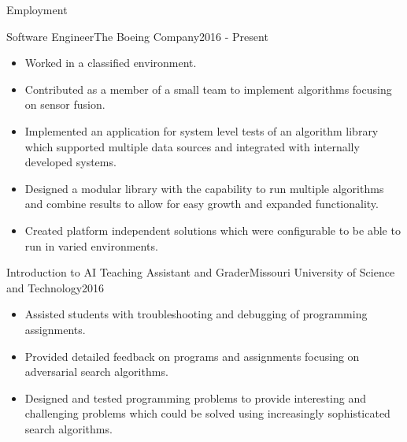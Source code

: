 \documentclass[]{mcdowellcv}
\begin{document}
    \makeheader
    
    \begin{cvsection}{Employment}

\begin{boeing}
        \begin{cvsubsection}{Software Engineer}{The Boeing Company}{2016 - Present}         
            \begin{itemize}
                \item Worked in a classified environment.
                \item Contributed as a member of a small team to implement algorithms focusing on sensor fusion.
                \item Implemented an application for system level tests of an algorithm library which supported multiple data sources and integrated with internally developed systems. 
                \item Designed a modular library with the capability to run multiple algorithms and combine results to allow for easy growth and expanded functionality.
                \item Created platform independent solutions which were configurable to be able to run in varied environments.
            \end{itemize}
        \end{cvsubsection}
\end{boeing}
        
\begin{aigrader}
        \begin{cvsubsection}[2]{Introduction to AI Teaching Assistant and Grader}{Missouri University of Science and Technology}{2016}   
            \begin{itemize}
                \item Assisted students with troubleshooting and debugging of programming assignments.
                \item Provided detailed feedback on programs and assignments focusing on adversarial search algorithms.
                \item Designed and tested programming problems to provide interesting and challenging problems which could be solved using increasingly sophisticated search algorithms.
            \end{itemize}
        \end{cvsubsection}
\end{aigrader}


\end{cvsection}
\end{document}
